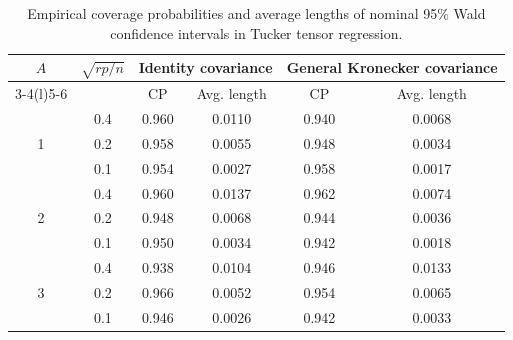 \begin{table}[!htbp]
\centering
\caption{Empirical coverage probabilities and average lengths of nominal 95\% Wald confidence intervals in Tucker tensor regression.}
\label{tab:tsr-cp-ci-sd1-combined}
\begin{threeparttable}
\setlength{\tabcolsep}{6pt}
\renewcommand{\arraystretch}{1.05}
\begin{tabular}{cc|cc|cc}
\toprule
\multirow{2}{*}{$A$} & \multirow{2}{*}{$\sqrt{rp/n}$} & \multicolumn{2}{c|}{Identity covariance} & \multicolumn{2}{c}{General Kronecker covariance} \\
\cmidrule(lr){3-4}\cmidrule(l){5-6}
 &  & CP & Avg. length & CP & Avg. length \\
\midrule
\multirow{3}{*}{1}
 & 0.4  & 0.960 & 0.0110 & 0.940 & 0.0068 \\
 & 0.2  & 0.958 & 0.0055 & 0.948 & 0.0034 \\
 & 0.1  & 0.954 & 0.0027 & 0.958 & 0.0017 \\
\midrule
\multirow{3}{*}{2}
 & 0.4  & 0.960 & 0.0137 & 0.962 & 0.0074 \\
 & 0.2  & 0.948 & 0.0068 & 0.944 & 0.0036 \\
 & 0.1  & 0.950 & 0.0034 & 0.942 & 0.0018 \\
\midrule
\multirow{3}{*}{3}
 & 0.4  & 0.938 & 0.0104 & 0.946 & 0.0133 \\
 & 0.2  & 0.966 & 0.0052 & 0.954 & 0.0065 \\
 & 0.1  & 0.946 & 0.0026 & 0.942 & 0.0033 \\
\bottomrule
\end{tabular}
\end{threeparttable}
\end{table}

